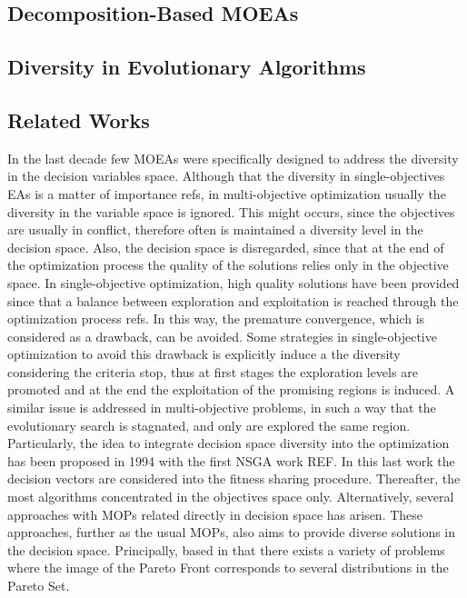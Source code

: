 \subsection{Decomposition-Based MOEAs}



\subsection{Diversity in Evolutionary Algorithms}


\subsection{Related Works}

In the last decade few MOEAs were specifically designed to address the diversity in the decision variables space.
%
Although that the diversity in single-objectives EAs is a matter of importance refs, in multi-objective optimization usually the diversity in the variable space is ignored.
%
This might occurs, since the objectives are usually in conflict, therefore often is maintained a diversity level in the decision space.
%
Also, the decision space is disregarded, since that at the end of the optimization process the quality of the solutions relies only in the objective space.
%
In single-objective optimization, high quality solutions have been provided since that a balance between exploration and exploitation is reached through the optimization process refs.
%
In this way, the premature convergence, which is considered as a drawback, can be avoided.
%
Some strategies in single-objective optimization to avoid this drawback is explicitly induce a the diversity considering the criteria stop, thus at first stages the exploration levels are promoted and at the end the exploitation of the promising regions is induced.
%
A similar issue is addressed in multi-objective problems, in such a way that the evolutionary search is stagnated, and only are explored the same region.
%
Particularly, the idea to integrate decision space diversity into the optimization has been proposed in 1994 with the first NSGA work REF.
%
In this last work the decision vectors are considered into the fitness sharing procedure.
%
Thereafter, the most algorithms concentrated in the objectives space only.
%
Alternatively, several approaches with MOPs related directly in decision space has arisen.
%
These approaches, further as the usual MOPs, also aims to provide diverse solutions in the decision space.
%
Principally, based in that there exists a variety of problems where the image of the Pareto Front corresponds to several distributions in the Pareto Set.
%


